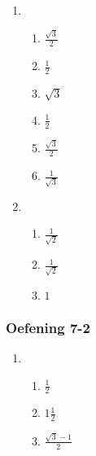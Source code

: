 {\begin{multicols}{3}
\begin{enumerate}[noitemsep, label=\textbf{\arabic*}. ]
\item %

\begin{enumerate}[itemsep=1pt, label=\textbf{(\alph*)} ]
\item $\frac{\sqrt{3}}{2}$%
\item $\frac{1}{2}$%
\item $\sqrt{3}$%
\item $\frac{1}{2}$%
\item $\frac{\sqrt{3}}{2}$%
\item $\frac{1}{\sqrt{3}}$%

\end{enumerate}


\item %


\begin{enumerate}[itemsep=1pt, label=\textbf{(\alph*)} ]
\item $\frac{1}{\sqrt{2}}$%
\item $\frac{1}{\sqrt{2}}$%
\item $1$%

\end{enumerate}
\end{enumerate}

\subsubsection*{Oefening 7-2} %

\begin{enumerate}[noitemsep, label=\textbf{\arabic*}. ] 
\item %
\begin{enumerate}[itemsep=1pt, label=\textbf{(\alph*)} ]
\item $\frac{1}{2}$%
\item $1\frac{1}{2}$%
\item $\frac{\sqrt{3}-1}{2}$%
\end{enumerate}


\end{enumerate}
\end{multicols}}
